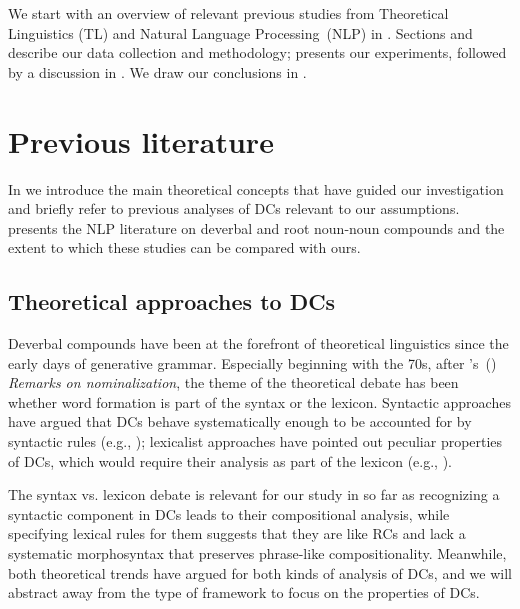 \documentclass[output=paper]{langsci/langscibook}
\begin{document}
We start with an overview of relevant  {previous studies from Theoretical Linguistics (TL)} and  {Natural Language Processing~(NLP)} in .
Sections  and  describe our data collection and methodology;  presents our experiments, followed by a discussion in . We draw our conclusions in .






\section{Previous literature}\label{sec:previous:lit}
In  we introduce the main theoretical concepts  that have guided our investigation and briefly refer to previous analyses of DCs relevant to our assumptions.  presents the  {NLP} literature on  {deverbal and root} noun-noun compounds and the extent to which these studies can be compared with ours.

\subsection{Theoretical approaches to DCs}\label{sec:theoretical:lit}
Deverbal compounds have been at the forefront of theoretical linguistics since the early days of generative grammar. Especially beginning with the 70s, after \citeauthor{chomsky:70}'s~(\citeyear{chomsky:70}) \textit{Remarks on nominalization}, the theme of the theoretical debate has been whether word formation is part of the syntax or the lexicon. Syntactic approaches have argued that DCs behave systematically enough to be accounted for by syntactic rules (e.g., \cite{roeper:siegel:78,ackema:neeleman:04}); lexicalist approaches have pointed out peculiar properties of DCs, which would require their analysis as part of the lexicon (e.g., \cite{selkirk:82,lieber:04}). 

The syntax vs. lexicon debate is relevant for our study in so far as recognizing a syntactic component in DCs leads to their compositional analysis, while specifying lexical rules for them suggests that they are like RCs and lack a systematic morphosyntax that preserves phrase-like compositionality. Meanwhile, both theoretical trends have argued for both kinds of analysis of DCs, and we will abstract away from the type of framework to focus on the properties of DCs.
\end{document}
